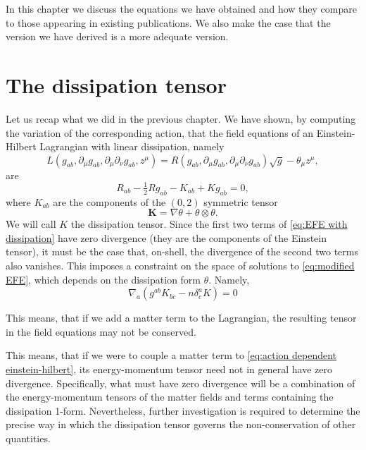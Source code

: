 \documentclass[../main.tex]{subfiles}
\begin{document}
In this chapter we discuss the equations we have obtained and how they compare to those
appearing in existing publications. We also make the case that the version we have derived
is a more adequate version. 

\section{The dissipation tensor}
Let us recap what we did in the previous chapter. We have shown, by computing the
variation of the corresponding action, that the field equations of an Einstein-Hilbert
Lagrangian with linear dissipation, namely
\begin{equation} 
	L(g_{ab}, \partial_\mu g_{ab}, \partial_\mu \partial_\nu g_{ab}, z^\mu) = R(g_{ab}, \partial_\mu g_{ab}, \partial_\mu \partial_\nu g_{ab})
	\sqrt{g} - \theta_\mu z^\mu,
\end{equation}
are
\begin{equation}\label{eq:EFE with dissipation}
   R_{ab} - \tfrac{1}{2}Rg_{ab} - K_{ab} + Kg_{ab} = 0,
\end{equation}
where \( K_{ab} \) are the components of the \( (0,2) \) symmetric tensor
\begin{equation}
	\mathbf{K} = \nabla \theta + \theta \otimes \theta.
\end{equation}
We will call \( K \) the dissipation tensor. Since the first two terms of \cref{eq:EFE with dissipation} have zero divergence (they are the components of the Einstein tensor), it must be the case that, on-shell, the divergence of the second two terms also vanishes. This imposes a constraint on the space of solutions to \cref{eq:modified EFE}, which depends on the dissipation form $\theta$. Namely,
\begin{equation}
\nabla_a\left(g^{ab}K_{bc}-n\delta^a_cK\right)=0
\end{equation}

This means, that if we add a matter term to the Lagrangian, the resulting  tensor in the field equations may not be conserved.

This means, that if we were to couple a matter term to \cref{eq:action dependent einstein-hilbert}, its energy-momentum tensor need not in general have zero divergence. Specifically, what must have zero divergence will be a combination of the energy-momentum tensors of the matter fields and terms containing the dissipation 1-form. Nevertheless, further investigation is required to determine the precise way in which the dissipation tensor governs the non-conservation of other quantities.
\end{document}
